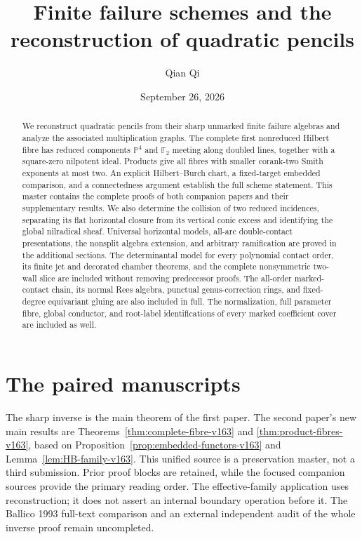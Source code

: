 \documentclass[11pt,reqno]{amsart}
\numberwithin{equation}{section}
\theoremstyle{definition}\newtheorem{definition}[theorem]{Definition}
\theoremstyle{remark}\newtheorem{remark}[theorem]{Remark}
\newcommand{\Pj}{\mathbb P}\newcommand{\A}{\mathbb A}
\begin{document}
\title[Finite failure schemes and quadratic pencils]{Finite failure schemes and the reconstruction of quadratic pencils}
\author{Qian Qi}
\date{September 26, 2026}
\begin{abstract}
We reconstruct quadratic pencils from their sharp unmarked finite
failure algebras and analyze the associated multiplication graphs.
The complete first nonreduced Hilbert fibre has reduced components
$\Pj^4$ and $\mathbb F_2$ meeting along doubled lines, together with
a square-zero nilpotent ideal. Products give all fibres with smaller
corank-two Smith exponents at most two. An explicit Hilbert--Burch
chart, a fixed-target embedded comparison, and a connectedness
argument establish the full scheme statement. This master contains
the complete proofs of both companion papers and their supplementary
results. We also determine the collision of
two reduced incidences, separating its flat horizontal closure from
its vertical conic excess and identifying the global nilradical sheaf.
Universal horizontal models, all-arc double-contact presentations,
the nonsplit algebra extension, and arbitrary ramification are
proved in the additional sections.
The determinantal model for every polynomial contact order, its finite
jet and decorated chamber theorems, and the complete nonsymmetric
two-wall slice are included without removing predecessor proofs.
The all-order marked-contact chain, its normal Rees algebra,
punctual genus-correction rings, and fixed-degree equivariant gluing
are also included in full.
The normalization, full parameter fibre, global conductor, and root-label
identifications of every marked coefficient cover are included as well.
\end{abstract}
\maketitle
\section*{The paired manuscripts}
\label{sec:introduction-v153}
The sharp inverse is the main theorem of the first paper. The second
paper's new main results are
Theorems~\ref{thm:complete-fibre-v163} and
\ref{thm:product-fibres-v163}, based on
Proposition~\ref{prop:embedded-functors-v163} and
Lemma~\ref{lem:HB-family-v163}. This unified source is a preservation
master, not a third submission. Prior proof blocks are retained,
while the focused companion sources provide the primary reading order.
The effective-family application uses reconstruction; it does not
assert an internal boundary operation before it. The Ballico 1993
full-text comparison and an external independent audit of the whole
inverse proof remain uncompleted.
\end{document}
